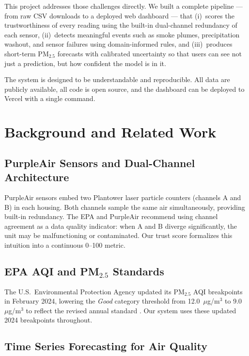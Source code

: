 \documentclass[11pt, letterpaper]{article}
\begin{document}
This project addresses those challenges directly.
We built a complete pipeline --- from raw CSV downloads to a deployed web dashboard ---
that (i)~scores the trustworthiness of every reading using the built-in dual-channel
redundancy of each sensor, (ii)~detects meaningful events such as smoke plumes,
precipitation washout, and sensor failures using domain-informed rules, and
(iii)~produces short-term PM$_{2.5}$ forecasts with calibrated uncertainty so that
users can see not just a prediction, but how confident the model is in it.

The system is designed to be understandable and reproducible.
All data are publicly available, all code is open source, and the dashboard can
be deployed to Vercel with a single command.

\section{Background and Related Work}

\subsection{PurpleAir Sensors and Dual-Channel Architecture}

PurpleAir sensors embed two Plantower laser particle counters (channels A and B)
in each housing.
Both channels sample the same air simultaneously, providing built-in redundancy.
The EPA and PurpleAir recommend using channel agreement as a data quality indicator:
when A and B diverge significantly, the unit may be malfunctioning or contaminated.
Our trust score formalizes this intuition into a continuous 0--100 metric.

\subsection{EPA AQI and PM$_{2.5}$ Standards}

The U.S.\ Environmental Protection Agency updated its PM$_{2.5}$ AQI breakpoints
in February 2024, lowering the \textit{Good} category threshold from
12.0~$\mu$g/m$^3$ to 9.0~$\mu$g/m$^3$ to reflect the revised annual standard
\cite{epa2024}. Our system uses these updated 2024 breakpoints throughout.

\subsection{Time Series Forecasting for Air Quality}
\end{document}
